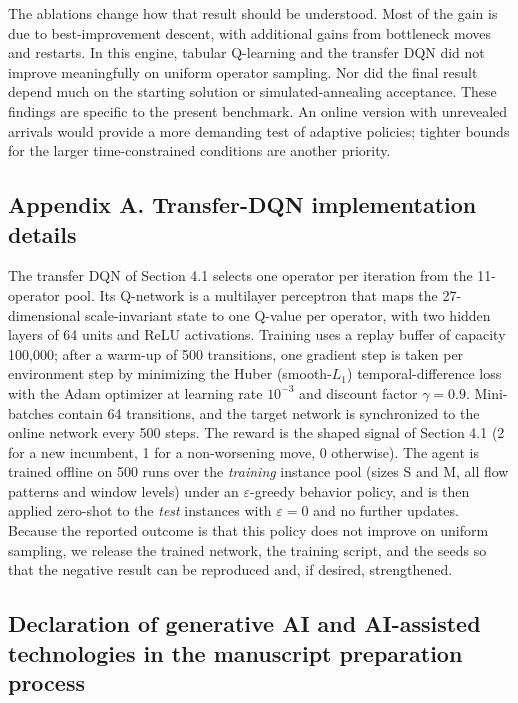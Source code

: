 \documentclass[
]{article}
\begin{document}
The ablations change how that result should be understood. Most of the
gain is due to best-improvement descent, with additional gains from
bottleneck moves and restarts. In this engine, tabular Q-learning and
the transfer DQN did not improve meaningfully on uniform operator
sampling. Nor did the final result depend much on the starting solution
or simulated-annealing acceptance. These findings are specific to the
present benchmark. An online version with unrevealed arrivals would
provide a more demanding test of adaptive policies; tighter bounds for
the larger time-constrained conditions are another priority.

\subsection{Appendix A. Transfer-DQN implementation
details}\label{appendix-a.-transfer-dqn-implementation-details}

The transfer DQN of Section 4.1 selects one operator per iteration from
the 11-operator pool. Its Q-network is a multilayer perceptron that maps
the 27-dimensional scale-invariant state to one Q-value per operator,
with two hidden layers of 64 units and ReLU activations. Training uses a
replay buffer of capacity 100,000; after a warm-up of 500 transitions,
one gradient step is taken per environment step by minimizing the Huber
(smooth-\(L_1\)) temporal-difference loss with the Adam optimizer at
learning rate \(10^{-3}\) and discount factor \(\gamma = 0.9\).
Mini-batches contain 64 transitions, and the target network is
synchronized to the online network every 500 steps. The reward is the
shaped signal of Section 4.1 (2 for a new incumbent, 1 for a
non-worsening move, 0 otherwise). The agent is trained offline on 500
runs over the \emph{training} instance pool (sizes S and M, all flow
patterns and window levels) under an \(\varepsilon\)-greedy behavior
policy, and is then applied zero-shot to the \emph{test} instances with
\(\varepsilon = 0\) and no further updates. Because the reported outcome
is that this policy does not improve on uniform sampling, we release the
trained network, the training script, and the seeds so that the negative
result can be reproduced and, if desired, strengthened.

\subsection{Declaration of generative AI and AI-assisted technologies in
the manuscript preparation
process}\label{declaration-of-generative-ai-and-ai-assisted-technologies-in-the-manuscript-preparation-process}
\end{document}
